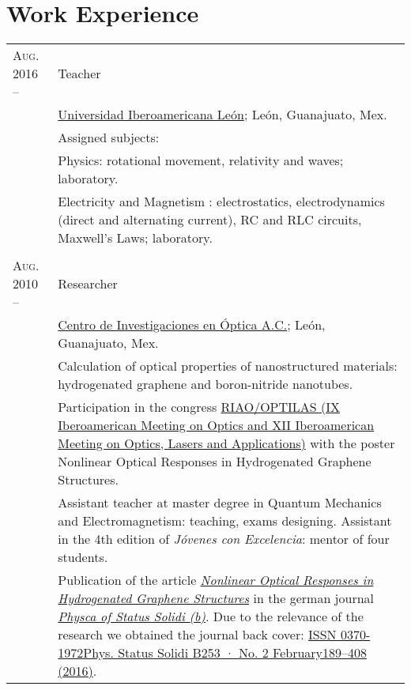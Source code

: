 \documentclass[letterpaper,10pt]{article}
\begin{document}
\section{Work Experience}
\begin{tabular}{R{4cm}|p{11cm}}
\textsc{Aug. 2016 --  } &   Teacher \\
                        &   \href{http://www.leon.uia.mx}{Universidad Iberoamericana Le\'on}; Le\'on, Guanajuato, Mex.\\
                        &   \footnotesize{Assigned subjects: }\\
                        &\footnotesize{\qquad Physics: rotational movement,  relativity and waves; laboratory. }\\
                        &\footnotesize{\qquad Electricity and Magnetism : electrostatics, electrodynamics (direct and alternating current), RC and RLC circuits, Maxwell's Laws; laboratory. }\\
                         \\
\textsc{Aug. 2010 --}   &   Researcher \\
                        &   \href{http://www.cio.mx/}{Centro de Investigaciones en \'Optica A.C.}; Le\'on, Guanajuato, Mex.\\
                        &   \footnotesize{Calculation of optical properties of nanostructured materials: hydrogenated graphene and boron-nitride nanotubes.}\\
                        &   \footnotesize{Participation in the congress \href{http://riaooptilas.cefop.cl/en/}{RIAO/OPTILAS (IX Iberoamerican Meeting on Optics and XII Iberoamerican Meeting on Optics, Lasers and Applications)} with the poster Nonlinear Optical Responses in Hydrogenated Graphene Structures.}\\
                        &   \footnotesize{Assistant teacher at master degree in Quantum Mechanics and Electromagnetism: teaching, exams designing. Assistant in the 4th edition of \emph{J\'ovenes con Excelencia}: mentor of four students.}\\
                        &   \footnotesize{Publication of the article \emph{\href{http://onlinelibrary.wiley.com/doi/10.1002/pssb.201670511/abstract}{Nonlinear Optical Responses in Hydrogenated Graphene Structures}} in the german journal \href{http://onlinelibrary.wiley.com/journal/10.1002/(ISSN)1521-3951}{\emph{Physca of Status Solidi (b)}}. Due to the relevance of the research we obtained the journal back cover: \href{http://onlinelibrary.wiley.com/doi/10.1002/pssb.201670511/epdf}{ISSN 0370-1972Phys. Status Solidi B253 · No. 2 February189–408 (2016)}.} \\

\end{tabular}
\end{document}
